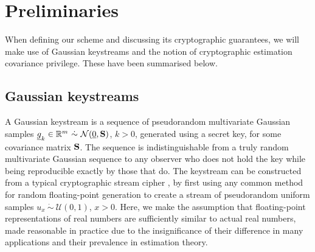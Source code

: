 \documentclass[conference]{IEEEtran}
\theoremstyle{definition}
\theoremstyle{remark}
\begin{document}
% 
%                                                                 
%                                                                 
%                                                                 
% 

\section{Preliminaries}\label{sec:prelim}
When defining our scheme and discussing its cryptographic guarantees, we will make use of Gaussian keystreams and the notion of cryptographic estimation covariance privilege. These have been summarised below.

% 
% 

\subsection{Gaussian keystreams}\label{subsec:gauss_keystreams}
A Gaussian keystream is a sequence of pseudorandom multivariate Gaussian samples $\vec{g}_k\in\mathbb{R}^m\ \dot{\sim}\ \mathcal{N}(\vec{0},\mat{S})$, $k>0$, generated using a secret key, for some covariance matrix ${{\mathbf{S}}}$. The sequence is indistinguishable from a truly random multivariate Gaussian sequence to any observer who does not hold the key while being reproducible exactly by those that do. The keystream can be constructed from a typical cryptographic stream cipher \cite[Ch. 3.6]{katzIntroductionModernCryptography2008}, by first using any common method for random floating-point generation \cite{goualardGeneratingRandomFloatingPoint2020} to create a stream of pseudorandom uniform samples $u_x\ \dot{\sim}\ \mathcal{U}(0,1)$, $x>0$. Here, we make the assumption that floating-point representations of real numbers are sufficiently similar to actual real numbers, made reasonable in practice due to the insignificance of their difference in many applications and their prevalence in estimation theory.
\end{document}
